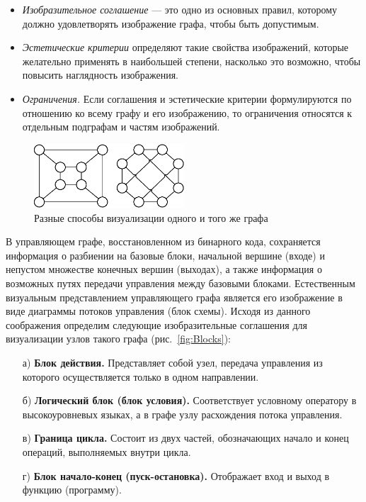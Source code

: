 \documentclass{jctart15a}
\begin{document}
\begin{itemize}
	\item \textit{Изобразительное соглашение} — это одно из основных правил, которому должно удовлетворять изображение графа, чтобы быть допустимым.

	\item \textit{Эстетические критерии} определяют такие свойства изображений, которые желательно применять в наибольшей степени, насколько это возможно, чтобы повысить наглядность изображения.

	\item \textit{Ограничения.} Если соглашения и эстетические критерии формулируются по отношению ко всему графу и его изображению, то ограничения относятся к отдельным подграфам и частям изображений.
\end{itemize}

\begin{figure}[htbp]
	\centering
		\includegraphics[width=0.50\textwidth]{Pic/Pic1.eps}
	\caption{Разные способы визуализации одного и того же графа}
	\label{fig:VisExample}
\end{figure}

В управляющем графе, восстановленном из бинарного кода, сохраняется информация о разбиении на базовые блоки, начальной вершине (входе) и непустом множестве конечных вершин (выходах), а также информация о возможных путях передачи управления между базовыми блоками. Естественным визуальным представлением управляющего графа является его изображение в виде диаграммы потоков управления (блок схемы). Исходя из данного соображения определим следующие изобразительные соглашения для визуализации узлов такого графа (рис.~\ref{fig:Blocks}):

\begin{enumerate}
	\item[а)]
		\textbf{Блок действия.}  Представляет собой узел, передача управления из которого осуществляется только в одном направлении.
	\item[б)]
		\textbf{Логический блок (блок условия).} Соответствует условному оператору в высокоуровневых языках, а в графе узлу расхождения потока управления.
	\item[в)]
		\textbf{Граница цикла.} Состоит из двух частей, обозначающих начало и конец операций, выполняемых внутри цикла.
	\item[г)]
		\textbf{Блок начало-конец (пуск-остановка).} Отображает вход и выход в функцию (программу).
\end{enumerate}
\end{document}
